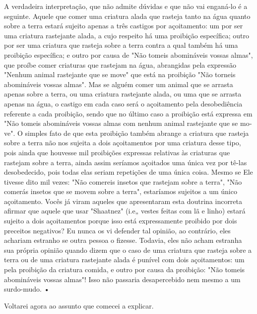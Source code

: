 \begin{itemize}
\begin{enumrate}
\begin{itemize}
\begin{itemize}
\begin{itemize}
A verdadeira interpretação, que não admite dúvidas e que não vai
enganá-lo é a seguinte. Aquele que comer uma criatura alada que rasteja
tanto na água quanto sobre a terra estará sujeito apenas a três castigos
por açoitamento: um por ser uma criatura rastejante alada, a cujo
respeito há uma proibição especí­fica; outro por ser uma criatura que
rasteja sobre a terra contra a qual também há uma proibição específica;
e outro por causa de "Não tomeis abomináveis vos­sas almas", que proíbe
comer criaturas que rastejam na água, abrangidas pela ex­pressão "Nenhum
animal rastejante que se move" que está na proibição "Não tor­neis
abomináveis vossas almas". Mas se alguém comer um animal que se arrasta
apenas sobre a terra, ou uma criatura rastejante alada, ou uma que se
arrasta ape­nas na água, o castigo em cada caso será o açoitamento pela
desobediência refe­rente a cada proibição, sendo que no último caso a
proibição está expressa em "Não tomeis abomináveis vossas almas com
nenhum animal rastejante que se mo­ve". O simples fato de que esta
proibição também abrange a criatura que rasteja sobre a terra não nos
sujeita a dois açoitamentos por uma criatura desse tipo, pois ainda que
houvesse mil proibições expressas relativas às criaturas que rastejam
sobre a terra, ainda assim seríamos açoitados uma única vez por tê-las
desobede­cido, pois todas elas seriam repetições de uma única coisa.
Mesmo se Ele tivesse dito mil vezes: "Não comereis insetos que rastejam
sobre a terra", "Não comerás insetos que se movem sobre a terra",
estaríamos sujeitos a um único açoitamento. Vocês já viram aqueles que
apresentaram esta doutrina incorreta afirmar que aquele que usar
"Shaatnez" (i.e„ vestes feitas com lã e linho) estará sujeito a dois
açoita­mentos porque isso está expressamente proibido por dois preceitos
negativos? Eu nunca os vi defender tal opinião, ao contrário, eles
achariam estranho se outra pessoa o fizesse. Todavia, eles não acham
estranha sua própria opinião quando dizem que o caso de uma criatura que
rasteja sobre a terra ou de uma criatura rastejante alada é punível com
dois açoitamentos: um pela proibição da criatura comida, e outro por
causa da proibição: "Não tomeis abomináveis vossas almas"! Isso não
passaria desapercebido nem mesmo a um surdo-mudo. •

Voltarei agora ao assunto que comecei a explicar.



\end{itemize}
\end{itemize}
\end{itemize}
\end{enumrate}
\end{itemize}
